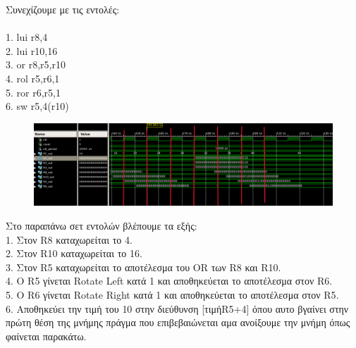 \begin{justify}
    Συνεχίζουμε με τις εντολές:\\\\
    \textlatin{1. lui r8,4}\\
    \textlatin{2. lui r10,16}\\
    \textlatin{3. or r8,r5,r10}\\
    \textlatin{4. rol r5,r6,1}\\
    \textlatin{5. ror r6,r5,1}\\
    \textlatin{6. sw r5,4(r10)}
\end{justify}

\newpage

\begin{figure}[h]
    \raggedright
    \hspace{-1cm}
    \includegraphics[width=1.1\textwidth]{Images/Screenshot_2.png} %
\end{figure}

\begin{justify}
    Στο παραπάνω σετ εντολών βλέπουμε τα εξής:\\
    1. Στον \textlatin{R8} καταχωρείται το 4.\\
    2. Στον \textlatin{R10} καταχωρείται το 16.\\
    3. Στον \textlatin{R5} καταχωρείται το αποτέλεσμα
    του \textlatin{OR} των \textlatin{R8} και \textlatin{R10}.\\
    4. O \textlatin{R5} γίνεται \textlatin{Rotate Left} κατά 1 και
    αποθηκεύεται το αποτέλεσμα στον \textlatin{R6}.\\
    5. Ο \textlatin{R6} γίνεται \textlatin{Rotate Right} κατά 1
    και αποθηκεύεται το αποτέλεσμα στον \textlatin{R5}.\\
    6. Aποθηκεύει την τιμή του \textlatin{10} στην διεύθυνση
    [τιμή\textlatin{R5+4}] όπου αυτο βγαίνει στην πρώτη θέση της μνήμης
    πράγμα που επιβεβαιώνεται αμα ανοίξουμε την μνήμη όπως
    φαίνεται παρακάτω.
\end{justify}

